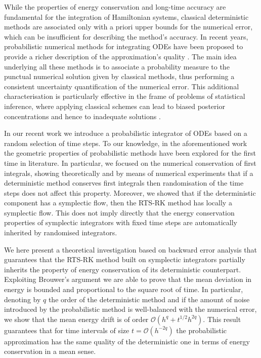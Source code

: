 \documentclass{siamart1116}
\numberwithin{theorem}{section}
\newcommand{\OO}{\mathcal{O}}
\begin{document}
While the properties of energy conservation and long-time accuracy are fundamental for the integration of Hamiltonian systems, classical deterministic methods are associated only with a priori upper bounds for the numerical error, which can be insufficient for describing the method's accuracy. In recent years, probabilistic numerical methods for integrating ODEs have been proposed  to provide a richer description of the approximation's quality \cite{AbG18, CGS16, KeH16, CCC16}. The main idea underlying all these methods is to associate a probability measure to the punctual numerical solution given by classical methods, thus performing a consistent uncertainty quantification of the numerical error. This additional characterisation is particularly effective in the frame of problems of statistical inference, where applying classical schemes can lead to biased posterior concentrations and hence to inadequate solutions \cite{AbG18, CGS16, COS17}.

In our recent work \cite{AbG18} we introduce a probabilistic integrator of ODEs based on a random selection of time steps. To our knowledge, in the aforementioned work the geometric properties of probabilistic methods have been explored for the first time in literature. In particular, we focused on the numerical conservation of first integrals, showing theoretically and by means of numerical experiments that if a deterministic method conserves first integrals then randomisation of the time steps does not affect this property. Moreover, we showed that if the deterministic component has a symplectic flow, then the RTS-RK method has locally a symplectic flow. This does not imply directly that the energy conservation properties of symplectic integrators with fixed time steps are automatically inherited by randomised integrators. 

We here present a theoretical investigation based on backward error analysis that guarantees that the RTS-RK method built on symplectic integrators partially inherits the property of energy conservation of its deterministic counterpart. Exploiting Brouwer's argument \cite{Bro37} we are able to prove that the mean deviation in energy is bounded and proportional to the square root of time. In particular, denoting by $q$ the order of the deterministic method and if the amount of noise introduced by the probabilistic method is well-balanced with the numerical error, we show that the mean energy drift is of order $\OO(h^q + t^{1/2}h^{2q})$. This result guarantees that for time intervals of size $t = \OO(h^{-2q})$ the probabilistic approximation has the same quality of the deterministic one in terms of energy conservation in a mean sense.
\end{document}
